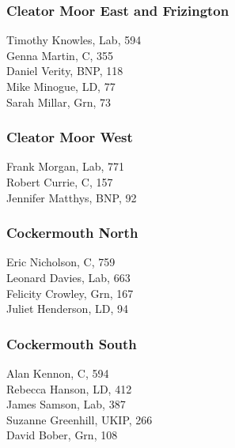 \documentclass[a4paper,openany,10pt]{book}
\begin{document}
\subsubsection*{Cleator Moor East and Frizington}



Timothy Knowles, Lab, 594\\
Genna Martin, C, 355\\
Daniel Verity, BNP, 118\\
Mike Minogue, LD, 77\\
Sarah Millar, Grn, 73\\


\subsubsection*{Cleator Moor West}



Frank Morgan, Lab, 771\\
Robert Currie, C, 157\\
Jennifer Matthys, BNP, 92\\


\subsubsection*{Cockermouth North}



Eric Nicholson, C, 759\\
Leonard Davies, Lab, 663\\
Felicity Crowley, Grn, 167\\
Juliet Henderson, LD, 94\\


\subsubsection*{Cockermouth South}



Alan Kennon, C, 594\\
Rebecca Hanson, LD, 412\\
James Samson, Lab, 387\\
Suzanne Greenhill, UKIP, 266\\
David Bober, Grn, 108\\
\end{document}
